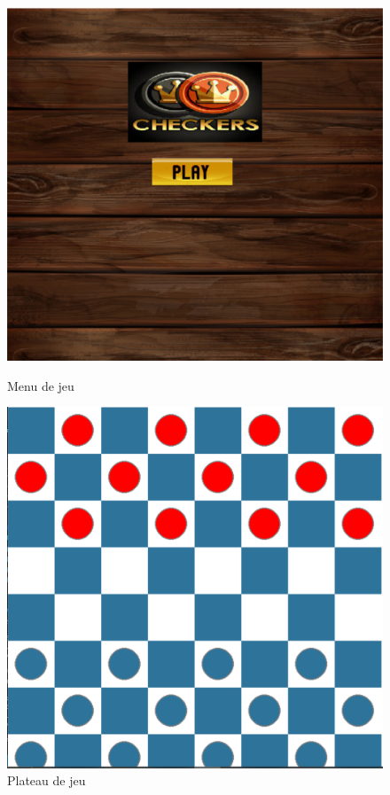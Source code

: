 \documentclass[12pt]{article}
\begin{document}
 	
 \begin{figure}[h]
 	\centering
 	\begin{minipage}[b]{0.45\linewidth}
 		\centering
 		\includegraphics[width=\textwidth]{Capture.png}
 		\caption{Menu de jeu}
 	\end{minipage}
 	\hfill
 	\begin{minipage}[b]{0.45\linewidth}
 		\centering
 		\includegraphics[width=\textwidth]{Capture1.png}
 		\caption{Plateau de jeu}
 	\end{minipage}
 \end{figure}
\end{document}
